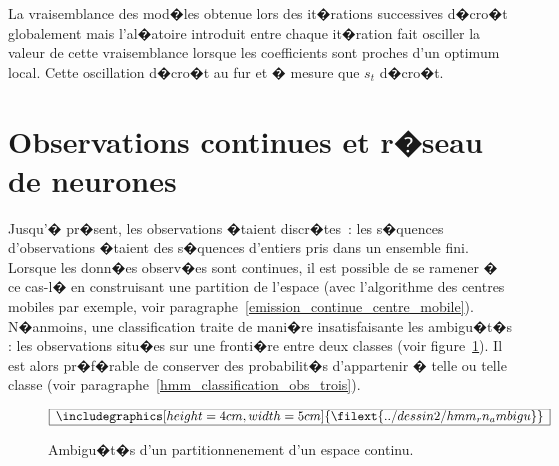 La vraisemblance des mod�les obtenue lors des it�rations successives d�cro�t globalement mais l'al�atoire introduit entre chaque it�ration fait osciller la valeur de cette vraisemblance lorsque les coefficients sont proches d'un optimum local. Cette oscillation d�cro�t au fur et � mesure que $s_t$ d�cro�t.















\section{Observations continues et r�seau de neurones} \label{hmm_sec_rn_obs_cont}

%
%

Jusqu'� pr�sent, les observations �taient discr�tes~: les s�quences d'observations �taient des s�quences d'entiers pris dans un ensemble fini. Lorsque les donn�es observ�es sont continues, il est possible de se ramener � ce cas-l� en construisant une partition de l'espace (avec l'algorithme des centres mobiles par exemple, voir paragraphe~\ref{emission_continue_centre_mobile}). N�anmoins, une classification traite de mani�re insatisfaisante les ambigu�t�s : les observations situ�es sur une fronti�re entre deux classes (voir figure~\ref{figure_partitionnement_ambigu-fig}). Il est alors pr�f�rable de conserver des probabilit�s d'appartenir � telle ou telle classe (voir paragraphe~\ref{hmm_classification_obs_trois}).

        \begin{figure}[ht]
    $$\frame{$\begin{array}[c|c]{c}\includegraphics[height=4cm, width=5cm] 
    {\filext{../dessin2/hmm_rn_ambigu}}\end{array}$}$$
    \caption{Ambigu�t�s d'un partitionnenement d'un espace continu.}
    \label{figure_partitionnement_ambigu-fig}
        \end{figure}







